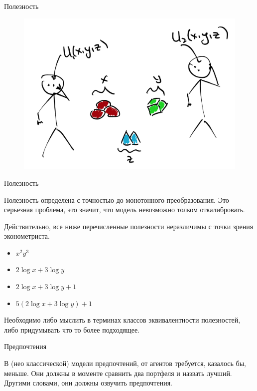 \documentclass{beamer}
\begin{document}
\begin{frame}{Полезность}

\begin{figure}[hbt]
\centering
\includegraphics[width=1 \textwidth]{pic2}
\end{figure}

\end{frame}

\begin{frame}{Полезность}

Полезность определена с точностью до монотонного преобразования. Это серьезная проблема, это значит, что модель невозможно толком откалибровать.

Действительно, все ниже перечисленные полезности неразличимы с точки зрения эконометриста. 
\begin{itemize}
\item $x^2 y^3$
\item $2 \log x + 3 \log y$
\item $2 \log x + 3 \log y + 1$
\item $5(2 \log x + 3 \log y) + 1$
\end{itemize}

Необходимо либо мыслить в терминах классов эквивалентности полезностей, либо придумывать что то более подходящее.

\end{frame}

\begin{frame}{Предпочтения}

В (нео классической) модели предпочтений, от агентов требуется, казалось бы, меньше. Они должны в моменте сравнить два портфеля и назвать лучший. Другими словами, они должны озвучить предпочтения.

\end{frame}
\end{document}
